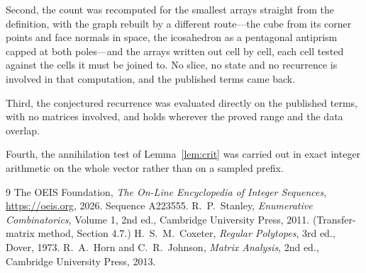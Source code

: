 \documentclass[11pt,a4paper]{article}
\theoremstyle{plain}
\theoremstyle{definition}
\begin{document}
Second, the count was recomputed for the smallest arrays straight from the definition, with the
graph rebuilt by a different route---the cube from its corner points and face normals in space,
the icosahedron as a pentagonal antiprism capped at both poles---and the arrays written out cell
by cell, each cell tested against the cells it must be joined to. No slice, no state and no
recurrence is involved in that computation, and the published terms came back.

Third, the conjectured recurrence was evaluated directly on the published terms, with no
matrices involved, and holds wherever the proved range and the data overlap.

Fourth, the annihilation test of Lemma~\ref{lem:crit} was carried out in exact integer
arithmetic on the whole vector rather than on a sampled prefix.

\begin{thebibliography}{9}
 The OEIS Foundation, \emph{The On-Line Encyclopedia of Integer
Sequences}, \url{https://oeis.org}, 2026. Sequence A223555.
 R.~P.~Stanley, \emph{Enumerative Combinatorics}, Volume 1, 2nd ed.,
Cambridge University Press, 2011. (Transfer-matrix method, Section 4.7.)
 H.~S.~M.~Coxeter, \emph{Regular Polytopes}, 3rd ed., Dover, 1973.
 R.~A.~Horn and C.~R.~Johnson, \emph{Matrix Analysis}, 2nd ed., Cambridge
University Press, 2013.
\end{thebibliography}
\end{document}
